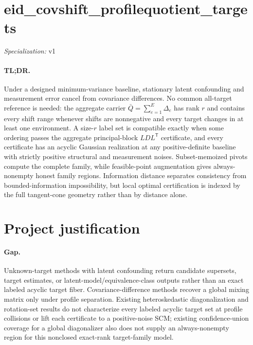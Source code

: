 \documentclass{article}
\begin{document}
\sloppy

\section*{eid\_\allowbreak{}covshift\_\allowbreak{}profilequotient\_\allowbreak{}targets}

\noindent\textit{Specialization:} v1\par

\paragraph{TL;DR.} Under a designed minimum-variance baseline, stationary latent confounding and measurement error cancel from covariance differences.  No common all-target reference is needed: the aggregate carrier \(\bar Q=\sum_{e=1}^E\Delta_e\) has rank \(r\) and contains every shift range whenever shifts are nonnegative and every target changes in at least one environment.  A size-\(r\) label set is compatible exactly when some ordering passes the aggregate principal-block \(LDL^{\mathsf T}\) certificate, and every certificate has an acyclic Gaussian realization at any positive-definite baseline with strictly positive structural and measurement noises.  Subset-memoized pivots compute the complete family, while feasible-point augmentation gives always-nonempty honest family regions.  Information distance separates consistency from bounded-information impossibility, but local optimal certification is indexed by the full tangent-cone geometry rather than by distance alone.

\section{Project justification}

\paragraph{Gap.} Unknown-target methods with latent confounding return candidate supersets, target estimates, or latent-model/equivalence-class outputs rather than an exact labeled acyclic target fiber.  Covariance-difference methods recover a global mixing matrix only under profile separation.  Existing heteroskedastic diagonalization and rotation-set results do not characterize every labeled acyclic target set at profile collisions or lift each certificate to a positive-noise SCM; existing confidence-union coverage for a global diagonalizer also does not supply an always-nonempty region for this nonclosed exact-rank target-family model.
\end{document}
